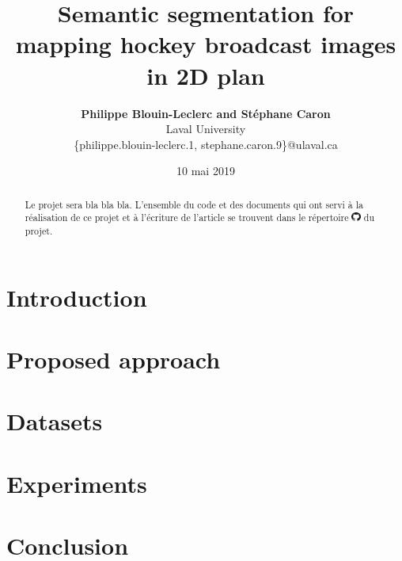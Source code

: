 \documentclass[10pt,letterpaper]{article}
\title{{\huge \bf Semantic segmentation for mapping hockey broadcast images in 2D plan}}
\author{{\bf Philippe Blouin-Leclerc and Stéphane Caron} \\ {Laval University} \\
{\{philippe.blouin-leclerc.1, stephane.caron.9\}}@ulaval.ca}
\date{10 mai 2019}
\numberwithin{equation}{section}
\begin{document}
\maketitle

\begin{multicols}{2}

\begin{abstract}
Le projet sera bla bla bla. L'ensemble du code et des documents qui ont servi à la réalisation de ce projet et à l'écriture de l'article se trouvent dans le répertoire \href{https://github.com/stecaron/glo-7030-projet}{\includegraphics[height=0.3cm]{GitHub-Mark-32px}} du projet.
\end{abstract}


\section{Introduction}




\section{Proposed approach}




\section{Datasets}




\section{Experiments}




\section{Conclusion}




\nocite{hastie01statisticallearning}



\setlength{\bibleftmargin}{.125in}
\setlength{\bibindent}{-\bibleftmargin}



\end{multicols}
\end{document}
